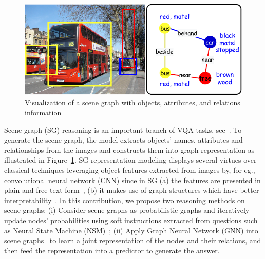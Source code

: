 \documentclass[letterpaper]{article} %
\begin{document}
\begin{figure}[ht] 
    \vspace{-0.1in}
    \centering 
    \includegraphics[scale=0.5]{./pic/intro.pdf} 
    \caption{Visualization of a scene graph with objects, attributes, and relations information} 
    \label{scene-graph} 
\end{figure}

Scene graph (SG) reasoning is an important branch of VQA tasks, see~\cite{DBLP:journals/corr/abs-2007-01072}. 
To generate the scene graph, the model extracts objects' names, attributes and relationships from the images and constructs them into graph representation as illustrated in Figure~\ref{scene-graph}. 
SG representation modeling displays several virtues over classical techniques leveraging object features extracted from images by, for eg., convolutional neural network (CNN) since in SG (a) the features are presented in plain and free text form~\cite{DBLP:journals/corr/abs-2101-05479}, (b) it makes use of graph structures which have better interpretability~\cite{DBLP:conf/bmvc/ZhangCX19}.
In this contribution, we propose two reasoning methods on scene graphs: (i) Consider scene graphs as probabilistic graphs and iteratively update nodes' probabilities using soft instructions extracted from questions such as Neural State Machine (NSM)~\cite{DBLP:conf/nips/HudsonM19,DBLP:conf/ijcnn/LeLV020}; (ii) Apply Graph Neural Network (GNN) into scene graphs~\cite{inproceedings,DBLP:conf/iccv/LiGCL19} to learn a joint representation of the nodes and their relations, and then feed the representation into a predictor to generate the answer.
\end{document}
